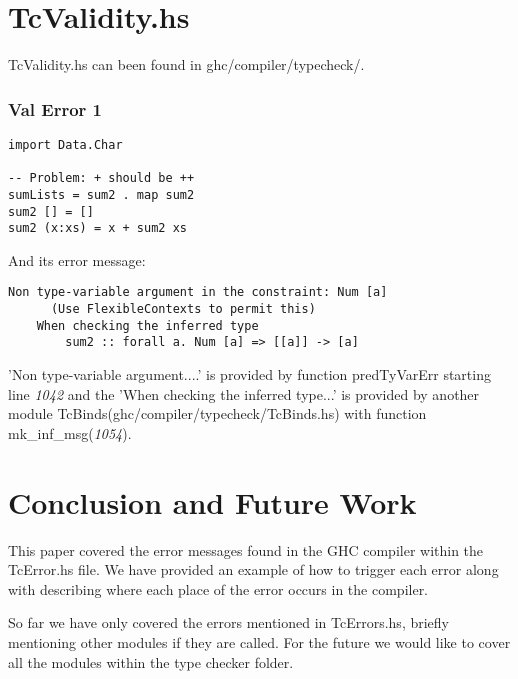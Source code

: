 \documentclass[a4paper]{article}
\begin{document}
\section{TcValidity.hs}

TcValidity.hs can been found in ghc/compiler/typecheck/. 

\subsubsection{Val Error 1}

\begin{lstlisting}[label={lst: T22.0}, numbers=none, caption={Example Program}]
import Data.Char

-- Problem: + should be ++
sumLists = sum2 . map sum2                       
sum2 [] = []
sum2 (x:xs) = x + sum2 xs
\end{lstlisting}

And its error message:
\hfill \break
\hfill \break
\begin{lstlisting}[label={lst: T22.0.2}, numbers=none, caption={Error}]
Non type-variable argument in the constraint: Num [a]
      (Use FlexibleContexts to permit this)
    When checking the inferred type
        sum2 :: forall a. Num [a] => [[a]] -> [a]
\end{lstlisting}

'Non type-variable argument....' is provided by function predTyVarErr starting line \textit{1042} and the 'When checking the inferred type...' is provided by another module TcBinds(ghc/compiler/typecheck/TcBinds.hs) with function mk\_inf\_msg(\textit{1054}).



\section{Conclusion and Future Work}

This paper covered the error messages found in the GHC compiler within the TcError.hs file. We have provided an example of how to trigger each error along with describing where each place of the error occurs in the compiler.

So far we have only covered the errors mentioned in TcErrors.hs, briefly mentioning other modules if they are called. For the future we would like to cover all the modules within the type checker folder.




\end{document}
